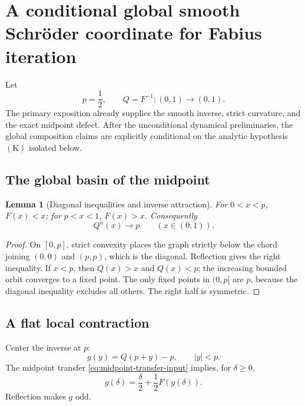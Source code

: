 \documentclass[11pt,oneside]{article}
\newtheorem{lemma}[theorem]{Lemma}
\theoremstyle{definition}
\theoremstyle{remark}
\begin{document}
\section{A conditional global smooth Schr\"oder coordinate for Fabius iteration}
\label{sec:koenigs}

Let
\[
 p=\frac12,
 \qquad Q=F^{-1}:(0,1)\to(0,1).
\]
The primary exposition already supplies the smooth inverse, strict curvature, and the exact
midpoint defect.  After the unconditional dynamical preliminaries, the global composition
claims are explicitly conditional on the analytic hypothesis \(\mathrm{(K)}\) isolated below.

\subsection{The global basin of the midpoint}

\begin{lemma}[Diagonal inequalities and inverse attraction]
\label{lem:diagonal}
For \(0<x<p\), \(F(x)<x\); for \(p<x<1\), \(F(x)>x\).  Consequently
\begin{equation}
 Q^n(x)\longrightarrow p
 \qquad(x\in(0,1)).
 \label{eq:inverse-attraction}
\end{equation}
\end{lemma}

\begin{proof}
On \([0,p]\), strict convexity places the graph strictly below the chord joining
\((0,0)\) and \((p,p)\), which is the diagonal.  Reflection gives the right inequality.  If
\(x<p\), then \(Q(x)>x\) and \(Q(x)<p\); the increasing bounded orbit converges to a fixed
point.  The only fixed points in \((0,p]\) are \(p\), because the diagonal inequality excludes
all others.  The right half is symmetric.
\end{proof}

\subsection{A flat local contraction}

Center the inverse at \(p\):
\begin{equation}
 g(y)=Q(p+y)-p,
 \qquad |y|<p.
 \label{eq:g-def}
\end{equation}
The midpoint transfer \eqref{eq:midpoint-transfer-input} implies, for \(\delta\ge0\),
\begin{equation}
 g(\delta)=\frac\delta2+\frac12F(g(\delta)).
 \label{eq:g-fixed}
\end{equation}
Reflection makes \(g\) odd.
\end{document}
